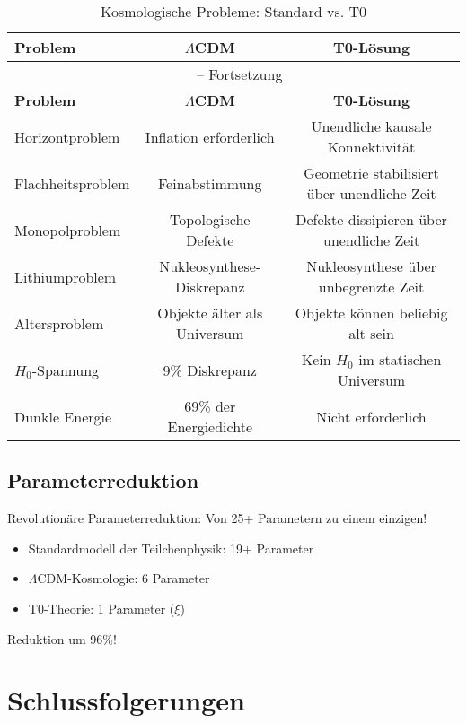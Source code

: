 \documentclass[12pt,a4paper]{article}
\begin{document}
	\begin{longtable}{lcc}
		\caption{Kosmologische Probleme: Standard vs. T0} \\
		\toprule
		\textbf{Problem} & \textbf{$\Lambda$CDM} & \textbf{T0-Lösung} \\
		\midrule
		\endfirsthead
		\multicolumn{3}{c}{\tablename\ \thetable{} -- Fortsetzung} \\
		\toprule
		\textbf{Problem} & \textbf{$\Lambda$CDM} & \textbf{T0-Lösung} \\
		\midrule
		\endhead
		Horizontproblem & Inflation erforderlich & Unendliche kausale Konnektivität \\
		Flachheitsproblem & Feinabstimmung & Geometrie stabilisiert über unendliche Zeit \\
		Monopolproblem & Topologische Defekte & Defekte dissipieren über unendliche Zeit \\
		Lithiumproblem & Nukleosynthese-Diskrepanz & Nukleosynthese über unbegrenzte Zeit \\
		Altersproblem & Objekte älter als Universum & Objekte können beliebig alt sein \\
		$H_0$-Spannung & 9\% Diskrepanz & Kein $H_0$ im statischen Universum \\
		Dunkle Energie & 69\% der Energiedichte & Nicht erforderlich \\
		\bottomrule
	\end{longtable}
	
	\subsection{Parameterreduktion}
	
	\begin{revolutionary}
		Revolutionäre Parameterreduktion: Von 25+ Parametern zu einem einzigen!
		\begin{itemize}
			\item Standardmodell der Teilchenphysik: 19+ Parameter
			\item $\Lambda$CDM-Kosmologie: 6 Parameter
			\item T0-Theorie: 1 Parameter ($\xi$)
		\end{itemize}
		Reduktion um 96\%!
	\end{revolutionary}
	
	\section{Schlussfolgerungen}
	
\end{document}

